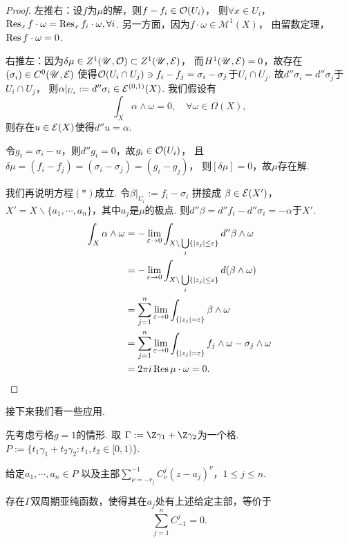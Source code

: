\begin{proof}
	左推右：设$f$为$\mu$的解，则$f-f_i\in \mathcal{O}(U_i)$，
    则$\forall x\in U_i$，$\operatorname{Res}_x f\cdot \omega=\operatorname{Res}_x f_i\cdot \omega, \forall i$. 
    另一方面，因为$f\cdot \omega \in \mathscr{M}^1(X)$，
    由留数定理，$\operatorname{Res} f\cdot \omega=0$.

	右推左：因为$\delta \mu \in Z^1(\mathscr{U}, \mathcal{O})\subset Z^1(\mathscr{U}, \mathcal{E})$，
    而$H^1(\mathscr{U}, \mathcal{E})=0$，故存在$(\sigma_i)\in C^0(\mathscr{U}, \mathcal{E})$
    使得$\mathcal{O}(U_i\cap U_j)\ni f_i-f_j=\sigma_i-\sigma_j$于$U_i\cap U_j$. 
    故$d''\sigma_i=d''\sigma_j$于$U_i\cap U_j$，
    则$\alpha|_{U_i}:=d''\sigma_i \in \mathcal{E}^{(0,1)}(X)$. 我们假设有
	\[\int_X \alpha \wedge \omega=0, \quad \forall \omega \in \Omega(X),\tag{$*$}\]
	则存在$u \in \mathcal{E}(X)$使得$d''u=\alpha$.

	令$g_i=\sigma_i-u$，则$d''g_i=0$，故$g_i\in \mathcal{O}(U_i)$，
    且$\delta \mu =(f_i-f_j)=(\sigma_i-\sigma_j)=(g_i-g_j)$，
    则$[\delta \mu]=0$，故$\mu$存在解.

	我们再说明方程$(*)$成立. 令$\beta|_{U_i}:=f_i-\sigma_i$ 拼接成 $\beta\in \mathcal{E}(X')$，
    $X'=X\backslash \{a_1,\cdots,a_n\}$，其中$a_j$是$\mu$的极点. 
    则$d''\beta=d''f_i-d''\sigma_i=-\alpha$于$X'$.
	\begin{align*}
		\int_X \alpha \wedge \omega
        &=-\lim\limits_{\varepsilon\to 0} \int_{X\backslash \bigcup\limits_j \{\vert z_j \vert \leq \varepsilon\}} d''\beta\wedge \omega\\
		&=-\lim\limits_{\varepsilon\to 0} \int_{X\backslash \bigcup\limits_j \{\vert z_j \vert \leq \varepsilon\}}  d(\beta\wedge \omega)\\
		&=\sum\limits_{j=1}^n \lim\limits_{\varepsilon\to 0} \int_{\{\vert z_j \vert = \varepsilon\}} \beta\wedge \omega\\
		&=\sum\limits_{j=1}^n \lim\limits_{\varepsilon\to 0} \int_{\{\vert z_j \vert = \varepsilon\}} f_j\wedge \omega-\sigma_j\wedge \omega\\
		&=2\pi i \operatorname{Res} \mu \cdot \omega=0.
	\end{align*}
\end{proof}

接下来我们看一些应用.

先考虑亏格$g=1$的情形. 取 $\Gamma:=\Z\gamma_1+\Z\gamma_2$为一个格. 
$P:=\{t_1\gamma_1+t_2\gamma_2: t_1, t_2\in [0,1)\}.$
\begin{proposition}
    给定$a_1,\cdots,a_n\in P$
    以及主部$\sum\limits_{\nu=-r_j}^{-1} C_\nu^j (z-a_j)^\nu$，$1\leq j\leq n$.

	存在$\Gamma$双周期亚纯函数，使得其在$a_j$处有上述给定主部，等价于
	$$\sum\limits_{j=1}^n C^j_{-1}=0.$$
\end{proposition}
		
